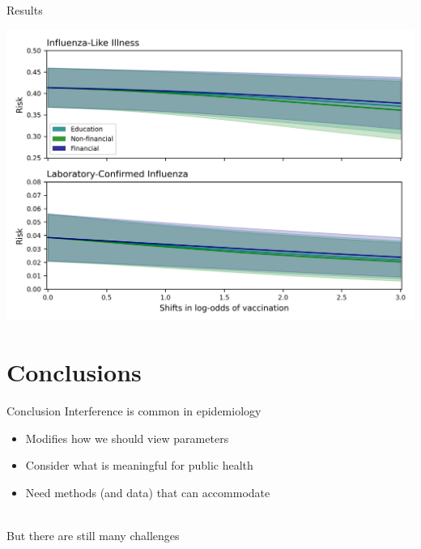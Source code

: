 \documentclass{beamer}
\begin{document}
\begin{frame}{Results}
	\begin{center}
		\includegraphics[width=0.99\linewidth]{images/aim3_measure.png}
	\end{center}
\end{frame}

\section{Conclusions}

\begin{frame}{Conclusion}
	Interference is common in epidemiology
	\begin{itemize}
		\item Modifies how we should view parameters
		\item Consider what is meaningful for public health
		\item Need methods (and data) that can accommodate
	\end{itemize}
	~\\
	But there are still many challenges
\end{frame}
\end{document}

